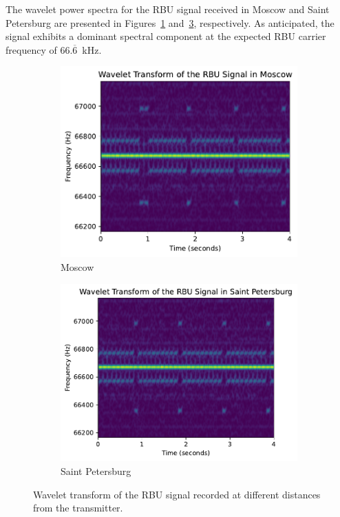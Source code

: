 \documentclass[12pt, a4paper]{extarticle}
\begin{document}
The wavelet power spectra for the RBU signal received in Moscow and Saint
Petersburg are presented in Figures~\ref{fig:moscow-spectrum}
and~\ref{fig:spb-spectrum}, respectively. As anticipated, the signal exhibits a
dominant spectral component at the expected RBU carrier frequency of
$66.\overline{6}$~kHz.

\begin{figure}[h]
  \centering
  \begin{subfigure}[b]{0.48\textwidth}
    \centering
    \includegraphics[height=0.75\textwidth]{ant-moscow.pdf}
    \caption{Moscow}
    \label{fig:moscow-spectrum}
  \end{subfigure}
  \hfill
  \begin{subfigure}[b]{0.48\textwidth}
    \centering
    \includegraphics[height=0.75\textwidth]{ant-spb.pdf}
    \caption{Saint Petersburg}
    \label{fig:spb-spectrum}
  \end{subfigure}
  \captionsetup{width=0.8\textwidth}
  \caption{Wavelet transform of the RBU signal recorded at different distances from the transmitter.}
\end{figure}
\end{document}

